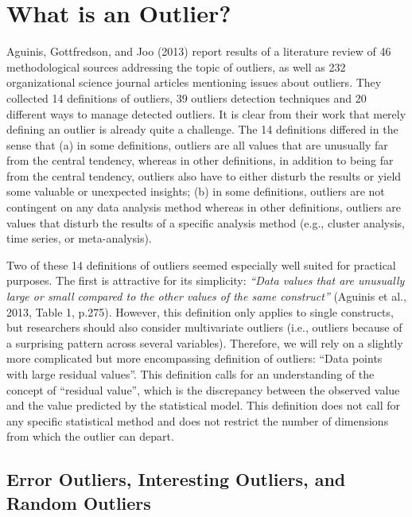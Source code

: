 \documentclass[man,floatsintext]{apa6}
\begin{document}
\section{What is an Outlier?}\label{what-is-an-outlier}

Aguinis, Gottfredson, and Joo (2013) report results of a literature
review of 46 methodological sources addressing the topic of outliers, as
well as 232 organizational science journal articles mentioning issues
about outliers. They collected 14 definitions of outliers, 39 outliers
detection techniques and 20 different ways to manage detected outliers.
It is clear from their work that merely defining an outlier is already
quite a challenge. The 14 definitions differed in the sense that (a) in
some definitions, outliers are all values that are unusually far from
the central tendency, whereas in other definitions, in addition to being
far from the central tendency, outliers also have to either disturb the
results or yield some valuable or unexpected insights; (b) in some
definitions, outliers are not contingent on any data analysis method
whereas in other definitions, outliers are values that disturb the
results of a specific analysis method (e.g., cluster analysis, time
series, or meta-analysis).

Two of these 14 definitions of outliers seemed especially well suited
for practical purposes. The first is attractive for its simplicity:
\emph{\enquote{Data values that are unusually large or small compared to
the other values of the same construct}} (Aguinis et al., 2013, Table 1,
p.275). However, this definition only applies to single constructs, but
researchers should also consider multivariate outliers (i.e., outliers
because of a surprising pattern across several variables). Therefore, we
will rely on a slightly more complicated but more encompassing
definition of outliers: \enquote{Data points with large residual
values}. This definition calls for an understanding of the concept of
\enquote{residual value}, which is the discrepancy between the observed
value and the value predicted by the statistical model. This definition
does not call for any specific statistical method and does not restrict
the number of dimensions from which the outlier can depart.

\subsection{Error Outliers, Interesting Outliers, and Random
Outliers}\label{error-outliers-interesting-outliers-and-random-outliers}
\end{document}
